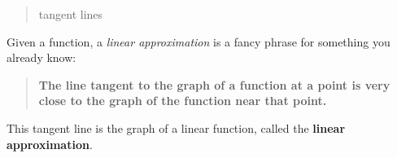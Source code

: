 \documentclass{ximera}
\title[{Graphs}
\begin{document}
\begin{abstract}
tangent lines
\end{abstract}
\maketitle


Given a function, a \textit{linear approximation} is a fancy phrase
for something you already know:
\begin{quote}
  \textbf{The line tangent to the graph of a function at a point is very close to the graph of the function near that point.}
\end{quote}
This tangent line is the graph of a linear function, called  the \textbf{linear approximation}.
\end{document}
